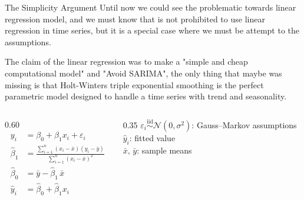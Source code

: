 \documentclass[13pt]{beamer}
\begin{document}
	\begin{frame}{The Simplicity Argument}
		Until now we could see the problematic towards linear regression model, and we must know that is not prohibited to use linear regression in time series, but it is a special case where we must be attempt to the assumptions. \newline
		
		The claim of the linear regression was to make a "simple and cheap computational model" and "Avoid SARIMA", the only thing that maybe was missing is that Holt-Winters triple exponential smoothing is the perfect parametric model designed to handle a time series with trend and seasonality.
		
		\begin{columns}[T]
			
			\begin{column}{0.60\textwidth}
				\vspace{-6pt}
				\begin{align*}
					y_i &= \beta_0 + \beta_1 x_i + \varepsilon_i \\[4pt]
					\hat{\beta}_1 &= \frac{\sum_{i=1}^n (x_i - \bar{x})(y_i - \bar{y})}
					{\sum_{i=1}^n (x_i - \bar{x})^2} \\[4pt]
					\hat{\beta}_0 &= \bar{y} - \hat{\beta}_1\,\bar{x} \\[4pt]
					\hat{y}_i &= \hat{\beta}_0 + \hat{\beta}_1 x_i
				\end{align*}
			\end{column}
			
			\vrule{}
			
			\begin{column}{0.35\textwidth}
				\vspace{23pt}
				\scriptsize
				$\varepsilon_i \overset{\text{iid}}{\sim} \mathcal{N}(0,\sigma^2)$:
				Gauss--Markov assumptions\\[6pt]
				$\hat{y}_i$: fitted value\\[6pt]
				$\bar{x},\,\bar{y}$: sample means
			\end{column}
			
		\end{columns}
		
	\end{frame}
	
\end{document}
